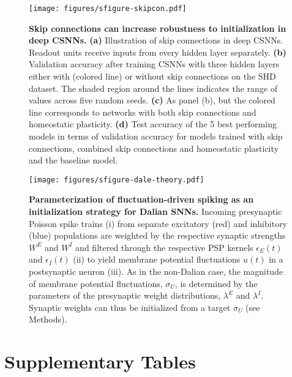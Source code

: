 \documentclass[11pt,a4paper]{article}
\begin{document}
\begin{refsection}
\begin{figure}[htb]
	\texttt{[image: figures/sfigure-skipcon.pdf]}
\caption{\textbf{Skip connections can increase robustness to initialization in deep \acp{CSNN}.}
\textbf{(a)} Illustration of skip connections in deep \acp{CSNN}. Readout units receive inputs from every hidden layer separately.
\textbf{(b)} Validation accuracy after training \acp{CSNN}  with three hidden layers either with (colored line) or without skip connections on the SHD dataset. The shaded region around the lines indicates the range of values across five random seeds. 
\textbf{(c)} As panel (b), but the colored line corresponds to networks with both skip connections and homeostatic plasticity.
\textbf{(d)} Test accuracy of the 5 best performing models in terms of validation accuracy for models trained with skip connections, combined skip connections and homeostatic plasticity and the baseline model. 
}
\label{sfig:skipcon}
\end{figure}

\begin{figure}[htb]
	\texttt{[image: figures/sfigure-dale-theory.pdf]}
\caption{\textbf{Parameterization of fluctuation-driven spiking as an initialization strategy for Dalian \acp{SNN}.}
	Incoming presynaptic Poisson spike trains (i) from separate excitatory (red) and inhibitory (blue) populations are weighted by the respective synaptic strengths $W^E$ and $W^I$ and filtered through the respective \ac{PSP} kernels $\epsilon_E(t)$ and $\epsilon_I(t)$ (ii) to yield membrane potential fluctuations $u(t)$ in a postsynaptic neuron (iii). As in the non-Dalian case, the magnitude of membrane potential fluctuations, $\sigma_U$, is determined by the parameters of the presynaptic weight distributions, $\lambda^E$ and $\lambda^I$. Synaptic weights can thus be initialized from a target $\sigma_U$ (see Methods).
}
\label{sfig:dale-theory}
\end{figure} 
\clearpage
\section*{Supplementary Tables}




\end{refsection}
\end{document}
